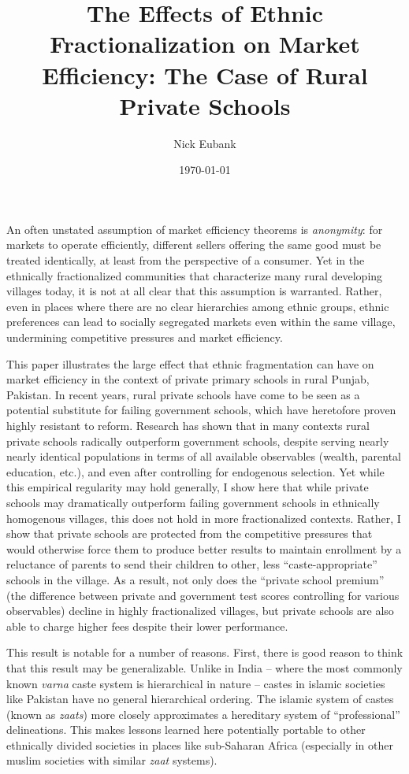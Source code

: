 \documentclass[12pt]{article}
\title{The Effects of Ethnic Fractionalization on Market Efficiency: The Case of Rural Private Schools}
\author{Nick Eubank}
\date{\today}
\begin{document}
 
\maketitle

An often unstated assumption of market efficiency theorems is \emph{anonymity}: for markets to operate efficiently, different sellers offering the same good must be treated identically, at least from the perspective of a consumer. Yet in the ethnically fractionalized communities that characterize many rural developing villages today, it is not at all clear that this assumption is warranted. Rather, even in places where there are no clear hierarchies among ethnic groups, ethnic preferences can lead to socially segregated markets even within the same village, undermining competitive pressures and market efficiency. 

This paper illustrates the large effect that ethnic fragmentation can have on market efficiency in the context of private primary schools in rural Punjab, Pakistan. In recent years, rural private schools have come to be seen as a potential substitute for failing government schools, which have heretofore proven highly resistant to reform. Research has shown that in many contexts rural private schools radically outperform government schools, despite serving nearly nearly identical populations in terms of all available observables (wealth, parental education, etc.), and even after controlling for endogenous selection. Yet while this empirical regularity may hold generally, I show here that while private schools may dramatically outperform failing government schools in ethnically homogenous villages, this does not hold in more fractionalized contexts. Rather, I show that private schools are protected from the competitive pressures that would otherwise force them to produce better results to maintain enrollment by a reluctance of parents to send their children to other, less ``caste-appropriate'' schools in the village. As a result, not only does the ``private school premium'' (the difference between private and government test scores controlling for various observables) decline in highly fractionalized villages, but private schools are also able to charge higher fees despite their lower performance. 

This result is notable for a number of reasons. First, there is good reason to think that this result may be generalizable. Unlike in India -- where the most commonly known \emph{varna} caste system is hierarchical in nature -- castes in islamic societies like Pakistan have no general hierarchical ordering. The islamic system of castes (known as \emph{zaats}) more closely approximates a hereditary system of ``professional'' delineations. This makes lessons learned here potentially portable to other ethnically divided societies in places like sub-Saharan Africa (especially in other muslim societies with similar \emph{zaat} systems).
\end{document}
